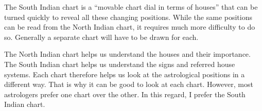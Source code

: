  

The South Indian chart is a “movable chart dial in terms of houses” that can be turned quickly to reveal all these changing positions. While the same positions can be read from the North Indian chart, it requires much more difficulty to do so. Generally a separate chart will have to be drawn for each.

 

The North Indian chart helps us understand the houses and their importance. The South Indian chart helps us understand the signs and referred house systems. Each chart therefore helps us look at the astrological positions in a different way. That is why it can be good to look at each chart. However, most astrologers prefer one chart over the other. In this regard, I prefer the South Indian chart.

